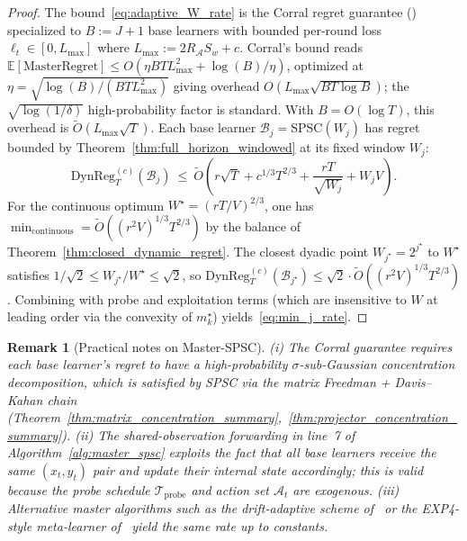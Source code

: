 \documentclass[11pt]{article}
\newcommand{\E}{\mathbb{E}}
\newcommand{\cA}{\mathcal{A}}
\newcommand{\cTprobe}{\mathcal{T}_{\mathrm{probe}}}
\newcommand{\DynReg}{\mathrm{DynReg}}
\newtheorem{remark}{Remark}
\begin{document}
\begin{proof}
The bound~\eqref{eq:adaptive_W_rate} is the Corral regret guarantee
(\citet[Theorem 5]{agarwal2017corralling}) specialized to
$B:=J+1$ base learners with bounded per-round loss $\ell_t\in[0,L_{\max}]$ where
$L_{\max}:=2R_\cA S_w+c$.  Corral's bound reads
$\E[\mathrm{MasterRegret}]\le O(\eta BT L_{\max}^2+\log(B)/\eta)$, optimized at
$\eta=\sqrt{\log(B)/(BT L_{\max}^2)}$ giving overhead
$O(L_{\max}\sqrt{BT\log B})$; the $\sqrt{\log(1/\delta)}$ high-probability
factor is standard.  With $B=O(\log T)$, this overhead is
$\widetilde O(L_{\max}\sqrt T)$.  Each base learner
$\mathcal B_j=\text{SPSC}(W_j)$ has regret bounded by Theorem~\ref{thm:full_horizon_windowed}
at its fixed window $W_j$:
\[
  \DynReg_T^{(c)}(\mathcal B_j)
  \ \le\ \widetilde O\!\left(r\sqrt T+c^{1/3}T^{2/3}+\frac{rT}{\sqrt{W_j}}+W_j V\right).
\]
For the continuous optimum $W^\star=(rT/V)^{2/3}$, one has
$\min_{\text{continuous}}=\widetilde O((r^2V)^{1/3}T^{2/3})$ by the balance of
Theorem~\ref{thm:closed_dynamic_regret}.  The closest dyadic point
$W_{j^\star}=2^{j^\star}$ to $W^\star$ satisfies
$1/\sqrt 2\le W_{j^\star}/W^\star\le\sqrt 2$, so
$\DynReg_T^{(c)}(\mathcal B_{j^\star})\le\sqrt 2\cdot\widetilde O((r^2V)^{1/3}T^{2/3})$.
Combining with probe and exploitation terms (which are insensitive to $W$ at
leading order via the convexity of $m_k^\star$) yields~\eqref{eq:min_j_rate}.
\end{proof}

\begin{remark}[Practical notes on Master-SPSC]
\label{rem:W_choice}
(i) The Corral guarantee requires each base learner's regret to have a
high-probability $\sigma$-sub-Gaussian concentration decomposition, which is
satisfied by SPSC via the matrix Freedman + Davis--Kahan chain
(Theorem~\ref{thm:matrix_concentration_summary},~\ref{thm:projector_concentration_summary}).
(ii) The shared-observation forwarding in line~7 of Algorithm~\ref{alg:master_spsc}
exploits the fact that all base learners receive the same $(x_t,y_t)$ pair and
update their internal state accordingly; this is valid because the probe
schedule $\cTprobe$ and action set $\cA_t$ are exogenous.  (iii) Alternative
master algorithms such as the drift-adaptive scheme
of~\citet{auer2019achieving} or the EXP4-style meta-learner
of~\citet{foster2021efficient} yield the same rate up to constants.
\end{remark}
\end{document}
